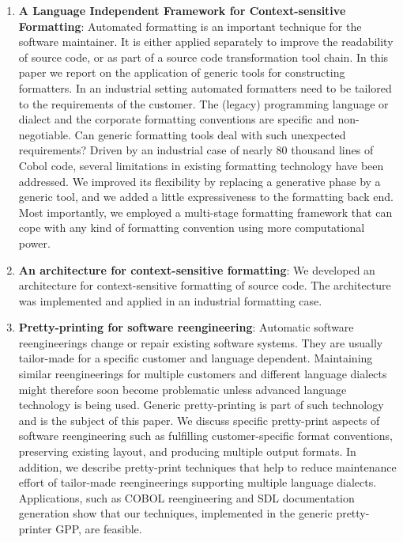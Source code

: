 \begin{englishtext}
\begin{enumerate}
    \item \textbf{A Language Independent Framework for Context-sensitive
    Formatting}: Automated formatting is an important technique for the software
    maintainer. It is either applied separately to improve the readability of
    source code, or as part of a source code transformation tool chain. In this
    paper we report on the application of generic tools for constructing
    formatters. In an industrial setting automated formatters need to be
    tailored to the requirements of the customer. The (legacy) programming
    language or dialect and the corporate formatting conventions are specific
    and non-negotiable. Can generic formatting tools deal with such unexpected
    requirements? Driven by an industrial case of nearly 80 thousand lines of
    Cobol code, several limitations in existing formatting technology have been
    addressed. We improved its flexibility by replacing a generative phase by a
    generic tool, and we added a little expressiveness to the formatting back
    end. Most importantly, we employed a multi-stage formatting framework that
    can cope with any kind of formatting convention using more computational
    power. \cite{independentFramework}

    \item \textbf{An architecture for context-sensitive formatting}: We
    developed an architecture for context-sensitive formatting of source code.
    The architecture was implemented and applied in an industrial formatting
    case. \cite{architectureFormatting}

    \item \textbf{Pretty-printing for software reengineering}: Automatic
    software reengineerings change or repair existing software systems. They are
    usually tailor-made for a specific customer and language dependent.
    Maintaining similar reengineerings for multiple customers and different
    language dialects might therefore soon become problematic unless advanced
    language technology is being used. Generic pretty-printing is part of such
    technology and is the subject of this paper. We discuss specific
    pretty-print aspects of software reengineering such as fulfilling
    customer-specific format conventions, preserving existing layout, and
    producing multiple output formats. In addition, we describe pretty-print
    techniques that help to reduce maintenance effort of tailor-made
    reengineerings supporting multiple language dialects. Applications, such as
    COBOL reengineering and SDL documentation generation show that our
    techniques, implemented in the generic pretty-printer GPP, are feasible.
    \cite{prettyPrinting}


\end{enumerate}
\end{englishtext}
